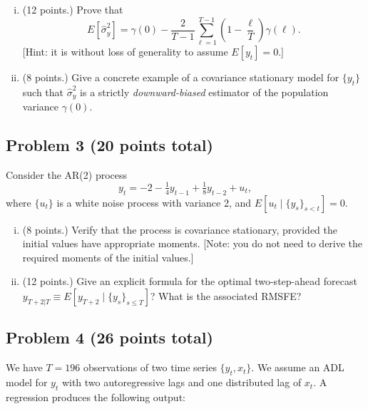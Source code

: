 \documentclass[12pt]{article}
\begin{document}
\begin{enumerate}[i)]
\item (12 points.) Prove that
\[E\left[\hat{\sigma}_y^2\right] = \gamma(0) - \frac{2}{T-1}\sum_{\ell=1}^{T-1} \left(1-\frac{\ell}{T}\right) \gamma(\ell).\]
[Hint: it is without loss of generality to assume $E[y_t]=0$.]
\item (8 points.) Give a concrete example of a covariance stationary model for $\lbrace y_t \rbrace$ such that $\hat{\sigma}_y^2$ is a strictly \emph{downward-biased} estimator of the population variance $\gamma(0)$.
\end{enumerate}

\subsection*{Problem 3 (20 points total)}
Consider the AR(2) process
\[y_t = -2 - \tfrac{1}{4}y_{t-1} + \tfrac{1}{8}y_{t-2} + u_t,\]
where $\lbrace u_t \rbrace$ is a white noise process with variance 2, and $E[u_t \mid \lbrace y_s \rbrace_{s<t}]=0$.

\begin{enumerate}[i)]
\item (8 points.) Verify that the process is covariance stationary, provided the initial values have appropriate moments. [Note: you do not need to derive the required moments of the initial values.]
\item (12 points.) Give an explicit formula for the optimal two-step-ahead forecast $y_{T+2|T} \equiv E[y_{T+2} \mid \lbrace y_s \rbrace_{s \leq T}]$? What is the associated RMSFE?
\end{enumerate}

\subsection*{Problem 4 (26 points total)}
We have $T=196$ observations of two time series $\lbrace y_t,x_t \rbrace$. We assume an ADL model for $y_t$ with two autoregressive lags and one distributed lag of $x_t$. A regression produces the following output:
\medskip
\end{document}

